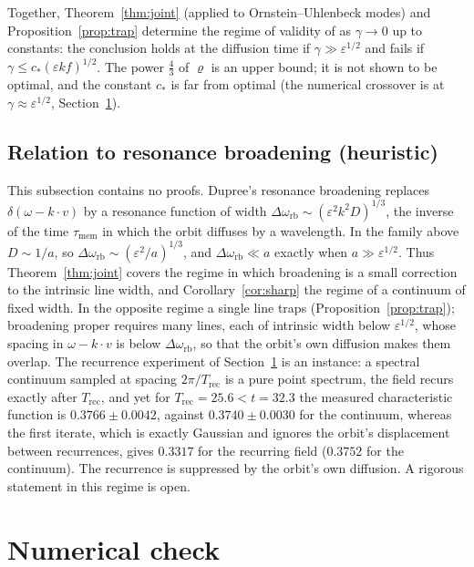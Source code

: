 \documentclass[11pt]{article}
\newcommand{\eps}{\varepsilon}
\newcommand{\rhoeff}{\varrho}
\theoremstyle{remark}
\begin{document}
Together, Theorem~\ref{thm:joint} (applied to Ornstein--Uhlenbeck modes) and
Proposition~\ref{prop:trap} determine the regime of validity of
\cite[Theorem~1]{Note} as $\gamma\to0$ up to constants: the conclusion holds
at the diffusion time if $\gamma\gg\eps^{1/2}$ and fails if
$\gamma\le c_*(\eps kf)^{1/2}$. The power $\frac43$ of $\rhoeff$ is an upper
bound; it is not shown to be optimal, and the constant $c_*$ is far from
optimal (the numerical crossover is at $\gamma\approx\eps^{1/2}$,
Section~\ref{sec:num}).

\subsection{Relation to resonance broadening (heuristic)}
\label{sec:dupree}

This subsection contains no proofs. Dupree's resonance broadening
\cite{Dupree} replaces $\delta(\omega-k\cdot v)$ by a resonance function of
width $\Delta\omega_{\mathrm{rb}}\sim(\eps^2k^2D)^{1/3}$, the inverse of the
time $\tau_{\mathrm{mem}}$ in which the orbit diffuses by a wavelength. In
the family above $D\sim1/a$, so
$\Delta\omega_{\mathrm{rb}}\sim(\eps^2/a)^{1/3}$, and
$\Delta\omega_{\mathrm{rb}}\ll a$ exactly when $a\gg\eps^{1/2}$. Thus
Theorem~\ref{thm:joint} covers the regime in which broadening is a small
correction to the intrinsic line width, and Corollary~\ref{cor:sharp} the
regime of a continuum of fixed width. In the opposite regime a single line
traps (Proposition~\ref{prop:trap}); broadening proper requires many lines,
each of intrinsic width below $\eps^{1/2}$, whose spacing in $\omega-k\cdot v$
is below $\Delta\omega_{\mathrm{rb}}$, so that the orbit's own diffusion
makes them overlap. The recurrence experiment of Section~\ref{sec:num} is an
instance: a spectral continuum sampled at spacing $2\pi/T_{\mathrm{rec}}$ is
a pure point spectrum, the field recurs exactly after $T_{\mathrm{rec}}$,
and yet for $T_{\mathrm{rec}} = 25.6<t = 32.3$ the measured characteristic
function is $0.3766\pm0.0042$, against $0.3740\pm0.0030$ for the continuum,
whereas the first iterate, which is exactly Gaussian and ignores the orbit's
displacement between recurrences, gives $0.3317$ for the recurring field
($0.3752$ for the continuum). The recurrence is suppressed by the orbit's
own diffusion. A rigorous statement in this regime is open.

\section{Numerical check}
\label{sec:num}
\end{document}
